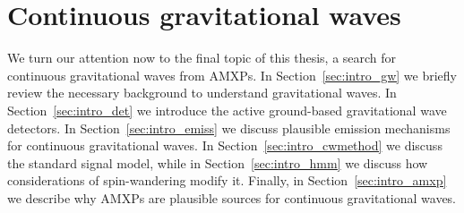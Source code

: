 \section{Continuous gravitational waves} \label{sec:intro_cw}
We turn our attention now to the final topic of this thesis, a search for continuous gravitational waves from AMXPs. In Section~\ref{sec:intro_gw} we briefly review the necessary background to understand gravitational waves. In Section~\ref{sec:intro_det} we introduce the active ground-based gravitational wave detectors. In Section~\ref{sec:intro_emiss} we discuss plausible emission mechanisms for continuous gravitational waves. In Section~\ref{sec:intro_cwmethod} we discuss the standard signal model, while in Section~\ref{sec:intro_hmm} we discuss how considerations of spin-wandering modify it. Finally, in Section~\ref{sec:intro_amxp} we describe why AMXPs are plausible sources for continuous gravitational waves. 

